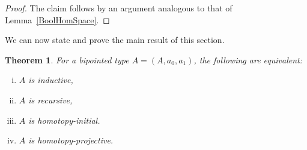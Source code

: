 \documentclass[reqno,10pt,a4paper,oneside]{amsart}
\numberwithin{equation}{section}
\theoremstyle{mythm}
\newtheorem{theorem}{Theorem}[subsection]
\theoremstyle{mydef}
\theoremstyle{myrmk}
\begin{document}
\begin{proof} The claim follows by an argument analogous to that of Lemma~\ref{BoolHomSpace}.
\end{proof}

\medskip

We can now state and prove the main result of this section. 


\begin{theorem}\label{lem:BoolMainInt} For a bipointed type $A = (A, a_0, a_1)$, the following are equivalent:
\begin{enumerate}[(i)]
\item $A$ is inductive, 
\item $A$ is recursive,
\item $A$ is homotopy-initial.
\item $A$ is homotopy-projective.
\end{enumerate}
\end{theorem}
\end{document}
